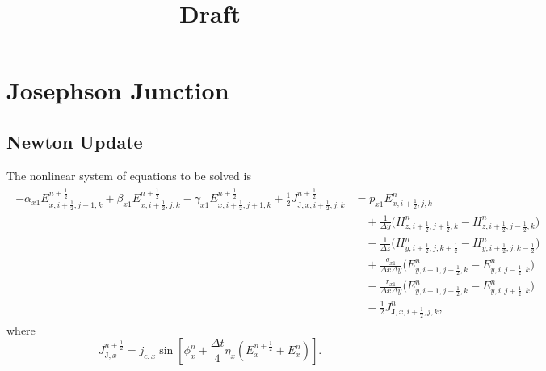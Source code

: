 \documentclass{article}
\title{Draft}
\numberwithin{figure}{section}
\begin{document}
\maketitle

\section{Josephson Junction}

\subsection{Newton Update}
The nonlinear system of equations to be solved is
\begin{align}
    \begin{split}
        -\alpha_{x1}E_{x,i+\tfrac12,j-1,k}^{n+\frac12}
        + \beta_{x1}E_{x,i+\tfrac12,j,k}^{n+\frac12}
        - \gamma_{x1}E_{x,i+\tfrac12,j+1,k}^{n+\frac12}
        +\frac12 J_{\mathrm{J},x,i+\tfrac12,j,k}^{n+\frac12}
         & = p_{x1}E_{x,i+\tfrac12,j,k}^{n}                                                                       \\
         & \quad +\frac{1}{\Delta y}\Big(H_{z,i+\tfrac12,j+\tfrac12,k}^{n}-H_{z,i+\tfrac12,j-\tfrac12,k}^{n}\Big) \\
         & \quad -\frac{1}{\Delta z}\Big(H_{y,i+\tfrac12,j,k+\tfrac12}^{n}-H_{y,i+\tfrac12,j,k-\tfrac12}^{n}\Big) \\
         & \quad +\frac{q_{x1}}{\Delta x\Delta y}\Big(E_{y,i+1,j-\tfrac12,k}^{n}-E_{y,i,j-\tfrac12,k}^{n}\Big)    \\
         & \quad -\frac{r_{x1}}{\Delta x\Delta y}\Big(E_{y,i+1,j+\tfrac12,k}^{n}-E_{y,i,j+\tfrac12,k}^{n}\Big)    \\
         & \quad -\frac12 J_{\mathrm{J},x,i+\tfrac12,j,k}^{n},
    \end{split}
    \label{eq:first-e-ex-adi-tridiagonal-josephson-newton}
\end{align}
where
\begin{equation}\label{eq:josephson-new-current}
    J_{\mathrm{J},x}^{n+\frac12}=j_{c,x}\sin\!\left[\phi_x^n+\frac{\Delta t}{4}\eta_x\left(E_x^{n+\frac12}+E_x^n\right)\right].
\end{equation}
\end{document}
